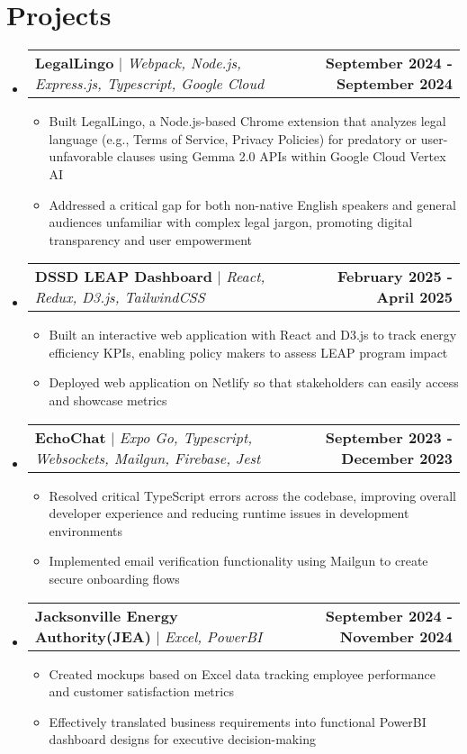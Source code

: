 \documentclass[letterpaper,11pt]{article}
\makeatletter
\newcommand{\resumeItem}[1]{
  \item\small{
    {#1 \vspace{-2pt}}
  }
}
\newcommand{\resumeProjectHeading}[2]{
    \item
    \begin{tabular*}{1.001\textwidth}{l@{\extracolsep{\fill}}r}
      \small#1 & \textbf{\small #2}\\
    \end{tabular*}\vspace{-7pt}
}
\newcommand{\resumeSubHeadingListStart}{\begin{itemize}[leftmargin=0.0in, label={}]}
\newcommand{\resumeSubHeadingListEnd}{\end{itemize}}
\newcommand{\resumeItemListStart}{\begin{itemize}}
\newcommand{\resumeItemListEnd}{\end{itemize}}
\makeatother
\begin{document}
\section{Projects}
    \resumeSubHeadingListStart
        \resumeProjectHeading
          {\textbf{LegalLingo} $|$ \emph{Webpack, Node.js, Express.js, Typescript, Google Cloud}}{September 2024 - September 2024}
          \resumeItemListStart
            \resumeItem{Built LegalLingo, a Node.js-based Chrome extension that analyzes legal language (e.g., Terms of Service, Privacy Policies) for predatory or user-unfavorable clauses using Gemma 2.0 APIs within Google Cloud Vertex AI}
            \resumeItem{Addressed a critical gap for both non-native English speakers and general audiences unfamiliar with complex legal jargon, promoting digital transparency and user empowerment}
          \resumeItemListEnd
        \resumeProjectHeading
          {\textbf{DSSD LEAP Dashboard} $|$ \emph{React, Redux, D3.js, TailwindCSS}}{February 2025 - April 2025}
          \resumeItemListStart
            \resumeItem{Built an interactive web application with React and D3.js to track energy efficiency KPIs, enabling policy makers to assess LEAP program impact}
            \resumeItem{Deployed web application on Netlify so that stakeholders can easily access and showcase metrics}
          \resumeItemListEnd
       \resumeProjectHeading
          {\textbf{EchoChat} $|$ \emph{Expo Go, Typescript, Websockets, Mailgun, Firebase, Jest}}{September 2023 - December 2023 }
          \resumeItemListStart
            \resumeItem {Resolved critical TypeScript errors across the codebase, improving overall developer experience and reducing runtime issues in development environments}
            \resumeItem{Implemented email verification functionality using Mailgun to create secure onboarding flows}
          \resumeItemListEnd
        \resumeProjectHeading
          {\textbf{Jacksonville Energy Authority(JEA)} $|$ \emph{Excel, PowerBI}}{September 2024 - November 2024 }
          \resumeItemListStart
            \resumeItem{Created mockups based on Excel data tracking employee performance and customer satisfaction metrics}
            \resumeItem{Effectively translated business requirements into functional PowerBI dashboard designs for executive decision-making}
          \resumeItemListEnd 
    \resumeSubHeadingListEnd

\end{document}
